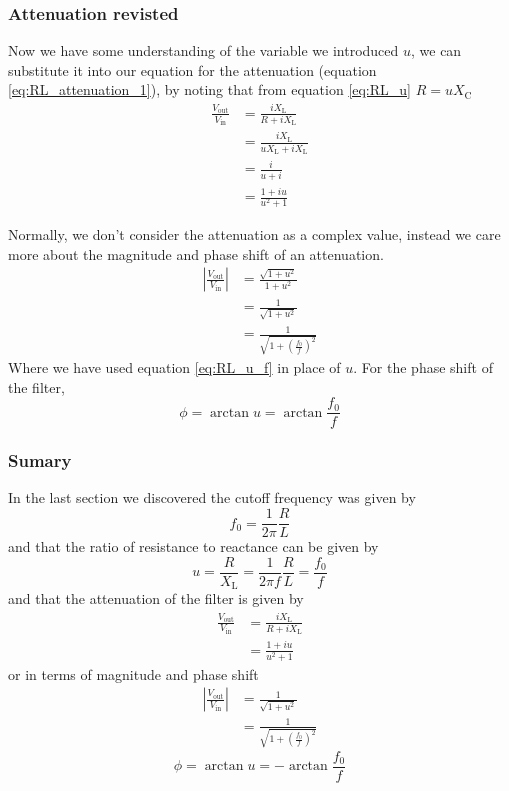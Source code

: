 \subsubsection{Attenuation revisted}
Now we have some understanding of the variable we introduced $u$, we can substitute it into our equation for the attenuation (equation \ref{eq:RL_attenuation_1}), by noting that from equation \ref{eq:RL_u} $R=u X_{\text{C}}$
\begin{align}
  \frac{V_{\text{out}}}{V_{\text{in}}} & = \frac{i X_{\text{L}}}{R+iX_{\text{L}}}\nonumber \\
   & = \frac{i X_{\text{L}}}{u X_{\text{L}}+iX_{\text{L}}} \nonumber \\
   & = \frac{i }{u +i} \nonumber \\
   & = \frac{1+iu}{u^2 + 1} \label{eq:RL_attenuation_2}
\end{align}

Normally, we don't consider the attenuation as a complex value, instead we care more
about the magnitude and phase shift of an attenuation.
\begin{align}
  \left|\frac{V_{\text{out}}}{V_{\text{in}}} \right| & = \frac{\sqrt{1+u^2}}{1+u^2}\nonumber \\
  & = \frac{1}{\sqrt{1+u^2}} \nonumber \\
  & = \frac{1}{\sqrt{1+\left(\frac{f_0}{f}\right)^2}}\label{eq:RL_attenuation_mag}
\end{align}
Where we have used equation \ref{eq:RL_u_f} in place of $u$. For the phase shift of the filter,
\begin{equation}
  \phi = \arctan{u} = \arctan{\frac{f_0}{f}}
\end{equation}

\begin{framed}
\subsubsection*{Sumary}
In the last section we discovered the cutoff frequency was given by
\begin{equation*}
 f_0 = \frac{1}{2\pi}\frac{R}{L}
\end{equation*}
and that the ratio of resistance to reactance can be given by
\begin{equation*}
  u = \frac{R}{X_{\text{L}}} = \frac{1}{2\pi f} \frac{R}{L} = \frac{f_0}{f}
\end{equation*}
and that the attenuation of the filter is given by
\begin{align*}
  \frac{V_{\text{out}}}{V_{\text{in}}} & = \frac{i X_{\text{L}}}{R+iX_{\text{L}}}\\
   & = \frac{1+i u}{u^2 + 1}
\end{align*}
or in terms of magnitude and phase shift
\begin{align*}
  \left|\frac{V_{\text{out}}}{V_{\text{in}}} \right| & = \frac{1}{\sqrt{1+u^2}} \\
  & = \frac{1}{\sqrt{1+\left(\frac{f_0}{f}\right)^2}}
\end{align*}
\begin{equation*}
  \phi = \arctan{u} =  -\arctan{\frac{f_0}{f}}
\end{equation*}
\end{framed}
